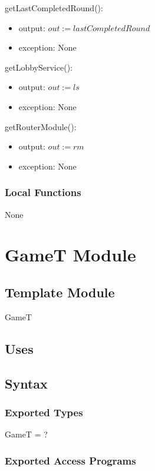 \documentclass[12pt, titlepage]{article}
\begin{document}
\noindent getLastCompletedRound():
\begin{itemize}
\item output: $out := lastCompletedRound$
\item exception: None
\end{itemize}

\noindent getLobbyService():
\begin{itemize}
\item output: $out := ls$
\item exception: None
\end{itemize}

\noindent getRouterModule():
\begin{itemize}
\item output: $out := rm$
\item exception: None
\end{itemize}

\subsubsection{Local Functions}
None

\newpage

\section{GameT Module} \label{GameT}

\subsection{Template Module}

GameT

\subsection{Uses}

\subsection{Syntax}

\subsubsection{Exported Types}

GameT = ?

\subsubsection{Exported Access Programs}
\end{document}
